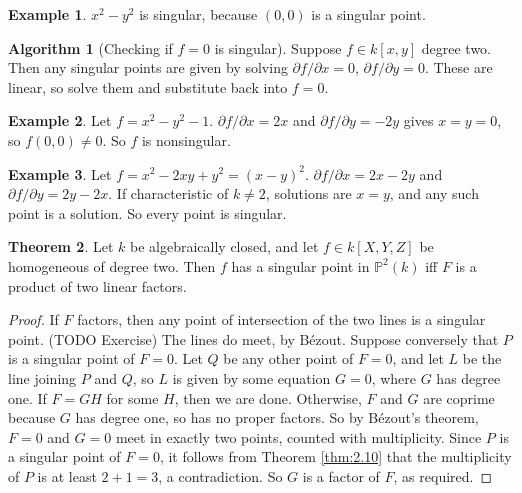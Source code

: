 \documentclass{article}
\renewcommand{\P}{\mathbb{P}}
\newcommand{\rb}[1]{\left( #1 \right)}
\renewcommand{\sb}[1]{\left[ #1 \right]}
\theoremstyle{definition}\newtheorem{definition}{Definition}[section]
\theoremstyle{definition}\newtheorem{remark}[definition]{Remark}
\theoremstyle{definition}\newtheorem*{example}{Example}
\theoremstyle{definition}\newtheorem*{note}{Note}
\newtheorem{theorem}[definition]{Theorem}
\newtheorem{algorithm}[definition]{Algorithm}
\begin{document}
\begin{example}
$ x^2 - y^2 $ is singular, because $ \rb{0, 0} $ is a singular point.
\end{example}

\begin{algorithm}[Checking if $ f = 0 $ is singular]
Suppose $ f \in k\sb{x, y} $ degree two. Then any singular points are given by solving $ \partial f / \partial x = 0 $, $ \partial f / \partial y = 0 $. These are linear, so solve them and substitute back into $ f = 0 $.
\end{algorithm}

\begin{example}
Let $ f = x^2 - y^2 - 1 $. $ \partial f / \partial x = 2x $ and $ \partial f / \partial y = -2y $ gives $ x = y = 0 $, so $ f\rb{0, 0} \ne 0 $. So $ f $ is nonsingular.
\end{example}

\begin{example}
Let $ f = x^2 - 2xy + y^2 = \rb{x - y}^2 $. $ \partial f / \partial x = 2x - 2y $ and $ \partial f / \partial y = 2y - 2x $. If characteristic of $ k \ne 2 $, solutions are $ x = y $, and any such point is a solution. So every point is singular.
\end{example}

\begin{theorem}
Let $ k $ be algebraically closed, and let $ f \in k\sb{X, Y, Z} $ be homogeneous of degree two. Then $ f $ has a singular point in $ \P^2\rb{k} $ iff $ F $ is a product of two linear factors.
\end{theorem}

\begin{proof}
If $ F $ factors, then any point of intersection of the two lines is a singular point. (TODO Exercise) The lines do meet, by Bézout. Suppose conversely that $ P $ is a singular point of $ F = 0 $. Let $ Q $ be any other point of $ F = 0 $, and let $ L $ be the line joining $ P $ and $ Q $, so $ L $ is given by some equation $ G = 0 $, where $ G $ has degree one. If $ F = GH $ for some $ H $, then we are done. Otherwise, $ F $ and $ G $ are coprime because $ G $ has degree one, so has no proper factors. So by Bézout's theorem, $ F = 0 $ and $ G = 0 $ meet in exactly two points, counted with multiplicity. Since $ P $ is a singular point of $ F = 0 $, it follows from Theorem \ref{thm:2.10} that the multiplicity of $ P $ is at least $ 2 + 1 = 3 $, a contradiction. So $ G $ is a factor of $ F $, as required.
\end{proof}
\end{document}
